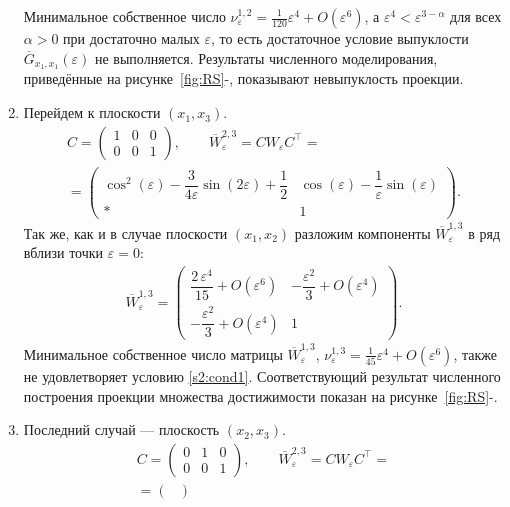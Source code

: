 \documentclass[../main.tex]{subfiles}
\begin{document}
\begin{enumerate}
 Минимальное собственное число $ \nu^{1,2}_{\varepsilon} = \frac{1}{120}\varepsilon^4 + O(\varepsilon^6)$, а $ \varepsilon^4 < \varepsilon^{3-\alpha} $ для всех $ \alpha > 0 $ при достаточно малых $ \varepsilon $, то есть достаточное условие выпуклости $ \overline{G}_{x_1, x_1}(\varepsilon) $ не выполняется. 
Результаты численного моделирования, приведённые на рисунке~\ref{fig:RS}-, показывают невыпуклость проекции. 
 \item Перейдем к плоскости $ (x_1,x_3) $. 
 \begin{gather*}
 C = \begin{pmatrix}
 1 & 0 & 0 \\
 0 & 0 & 1
 \end{pmatrix}, \qquad
 \overline{W}_{\varepsilon}^{2,3} = C W_{\varepsilon} C^{\top} = \\ =\begin{pmatrix}
 \cos^2(\varepsilon)-\dfrac{3}{4\varepsilon}\sin(2\varepsilon)+\dfrac{1}{2} & 
 \cos\left(\varepsilon \right)-\dfrac{1}{\varepsilon} \sin\left(\varepsilon \right) \\ 
 * & 1
 \end{pmatrix}.
 \end{gather*}
 Так же, как и в случае плоскости $ (x_1,x_2) $ разложим компоненты $ \overline{W}_{\varepsilon}^{1,3} $ в ряд вблизи точки $ \varepsilon = 0 $:
 \begin{gather*}
 \overline{W}_{\varepsilon}^{1,3} = \begin{pmatrix} 
 \dfrac{2\,\varepsilon ^4}{15} + O(\varepsilon^6) &
 -\dfrac{\varepsilon^2}{3}+ O(\varepsilon ^4)\\[8pt]
 -\dfrac{\varepsilon^2}{3} + O(\varepsilon^4) & 1 \end{pmatrix}.
 \end{gather*}
 Минимальное собственное число матрицы $ \overline{W}_{\varepsilon}^{1,3} $, $ \nu^{1,3}_{\varepsilon} = \frac{1}{45}\varepsilon^4 + O(\varepsilon^6) $, также не удовлетворяет условию \eqref{s2:cond1}. 
Соответствующий результат численного построения проекции множества достижимости показан на рисунке~\ref{fig:RS}-.
 \item Последний случай --- плоскость $ (x_2,x_3) $.
 \begin{gather*}
 C = \begin{pmatrix}
 0 & 1 & 0 \\
 0 & 0 & 1
 \end{pmatrix}, \qquad
 \overline{W}_{\varepsilon}^{2,3} = C W_{\varepsilon} C^{\top} =\\=\begin{pmatrix}

\end{pmatrix}
\end{gather*}
\end{enumerate}
\end{document}
